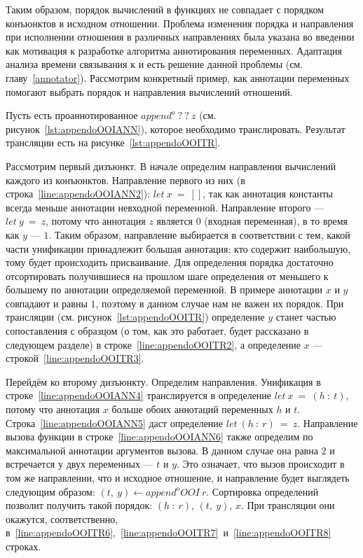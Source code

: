 Таким образом, порядок вычислений в функциях не совпадает с порядком конъюнктов в исходном отношении.
Проблема изменения порядка и направления при исполнении отношения в различных направлениях была указана во введении как мотивация к разработке алгоритма аннотирования переменных.
Адаптация анализа времени связывания к \miniKanren{} и есть решение данной проблемы (см. главу~\ref{annotator}).
Рассмотрим конкретный пример, как аннотации переменных помогают выбрать порядок и направления вычислений отношений.

Пусть есть проаннотированное $append^o \ ? \ ? \ z$ (см. рисунок~\ref{lst:appendoOOIANN}), которое необходимо транслировать.
Результат трансляции есть на рисунке~\ref{lst:appendoOOITR}.

Рассмотрим первый дизъюнкт.
В начале определим направления вычислений каждого из конъюнктов.
Направление первого из них (в строка~\ref{line:appendoOOIANN2}): $let~x~=~[]$, так как аннотация константы всегда меньше аннотации невходной переменной.
Направление второго --- $let~y~=~z$, потому что аннотация $z$ является $0$ (входная переменная), в то время как $y$ --- $1$.
Таким образом, направление выбирается в соответствии с тем, какой части унификации принадлежит большая аннотация: кто содержит наибольшую, тому будет происходить присваивание.
Для определения порядка достаточно отсортировать получившиеся на прошлом шаге определения от меньшего к большему по аннотации определяемой переменной.
В примере аннотации $x$ и $y$ совпадают и равны $1$, поэтому в данном случае нам не важен их порядок.
При трансляции (см. рисунок~\ref{lst:appendoOOITR}) определение $y$ станет частью сопоставления с образцом (о том, как это работает, будет рассказано в следующем разделе) в строке~\ref{line:appendoOOITR2}, а определение $x$ --- строкой~\ref{line:appendoOOITR3}.

Перейдём ко второму дизъюнкту.
Определим направления.
Унификация в строке~\ref{line:appendoOOIANN4} транслируется в определение $let~x~=~(h~:~t)$, потому что аннотация $x$ больше обоих аннотаций переменных $h$ и $t$.
Строка~\ref{line:appendoOOIANN5} даст определение $let~(h~:~r)~=~z$.
Направление вызова функции в строке~\ref{line:appendoOOIANN6} также определим по максимальной аннотации аргументов вызова.
В данном случае она равна $2$ и встречается у двух переменных --- $t$ и $y$.
Это означает, что вызов происходит в том же направлении, что и исходное отношение, и направление будет выглядеть следующим образом: $(t,~y) \gets append^oOOI~r$.
Сортировка определений позволит получить такой порядок: $(h~:~r)$, $(t,~y)$, $x$.
При трансляции они окажутся, соответственно, в~\ref{line:appendoOOITR6},~\ref{line:appendoOOITR7}~и~\ref{line:appendoOOITR8} строках.

